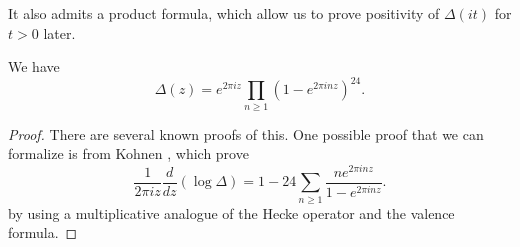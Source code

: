 It also admits a product formula, which allow us to prove positivity of $\Delta(it)$ for $t > 0$ later.
\begin{lemma}\label{lemma:disc-prodformula}
We have
\begin{equation}\label{eqn:disc-prodformula}
\Delta(z) = e^{2 \pi i z} \prod_{n \ge 1} (1 - e^{2 \pi i n z})^{24}.
\end{equation}
\end{lemma}
\begin{proof}
There are several known proofs of this.
One possible proof that we can formalize is from Kohnen \cite{Kohnen}, which prove
\begin{equation}\label{eqn:disc-logder}
    \frac{1}{2\pi i z} \frac{d}{dz}(\log \Delta) = 1 - 24 \sum_{n \ge 1} \frac{ne^{2 \pi i n z}}{1 - e^{2 \pi i n z}}.
\end{equation}
by using a multiplicative analogue of the Hecke operator and the valence formula.
\end{proof}

